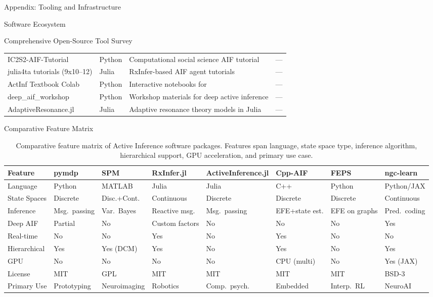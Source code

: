 \documentclass[
  ignorenonframetext,
]{beamer}
\begin{document}
\begin{frame}[fragile]{Appendix: Tooling and Infrastructure
\label{sec:tooling}}
\begin{block}{Software Ecosystem}
\begin{block}{Comprehensive Open-Source Tool Survey}
\begin{center}
\begin{longtable}{p{3.2cm} p{1.6cm} p{4.4cm} p{2.5cm}}
IC2S2-AIF-Tutorial & Python & Computational social science AIF tutorial & — \\
julia4ta tutorials (9x10--12) & Julia & RxInfer-based AIF agent tutorials & — \\
ActInf Textbook Colab & Python & Interactive notebooks for \cite{parr2022active} & — \\
deep\_aif\_workshop & Python & Workshop materials for deep active inference & — \\
AdaptiveResonance.jl & Julia & Adaptive resonance theory models in Julia & — \\
\hline
\end{longtable}
\end{center}
\end{block}

\begin{block}{Comparative Feature Matrix}
\protect{}\label{comparative-feature-matrix}
\begin{table}[htbp]
\centering
\caption{Comparative feature matrix of Active Inference software packages. Features span language, state space type, inference algorithm, hierarchical support, GPU acceleration, and primary use case.}
\label{tab:aif_feature_matrix}
\begin{tabular}{llllllll}
\toprule
\textbf{Feature} & \textbf{pymdp} & \textbf{SPM} & \textbf{RxInfer.jl} & \textbf{ActiveInference.jl} & \textbf{Cpp-AIF} & \textbf{FEPS} & \textbf{ngc-learn} \\
\midrule
Language & Python & MATLAB & Julia & Julia & C++ & Python & Python/JAX \\
State Spaces & Discrete & Disc.+Cont. & Continuous & Discrete & Discrete & Discrete & Continuous \\
Inference & Msg.\ passing & Var.\ Bayes & Reactive msg. & Msg.\ passing & EFE+state est. & EFE on graphs & Pred.\ coding \\
Deep AIF & Partial & No & Custom factors & No & No & No & Yes \\
Real-time & No & No & Yes & No & Yes & No & No \\
Hierarchical & Yes & Yes (DCM) & Yes & No & Yes & No & Yes \\
GPU & No & No & No & No & CPU (multi) & No & Yes (JAX) \\
License & MIT & GPL & MIT & MIT & MIT & MIT & BSD-3 \\
Primary Use & Prototyping & Neuroimaging & Robotics & Comp.\ psych. & Embedded & Interp.\ RL & NeuroAI \\
\bottomrule
\end{tabular}
\end{table}


\end{block}
\end{block}
\end{frame}
\end{document}
